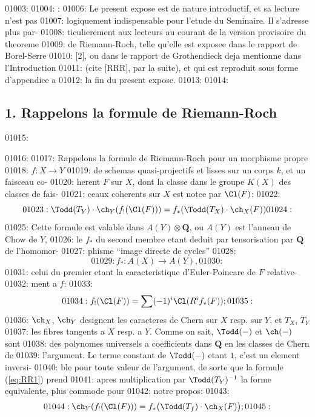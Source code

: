 01003: 
01004: : 
01006: Le present expose est de nature introductif, et sa lecture n'est pas
01007: logiquement indispensable pour l'etude du Seminaire. Il s'adresse plus par-
01008: ticulierement aux lecteurs au courant de la version provisoire du theoreme
01009: de Riemann-Roch, telle qu'elle est exposee dans le rapport de Borel-Serre
01010: [2], ou dans le rapport de Grothendieck deja mentionne dans l'Introduction
01011: (cite [RRR], par la suite), et qui est reproduit sous forme d'appendice a
01012: la fin du present expose.
01013: 
01014: \subsection*{1. Rappelons la formule de Riemann-Roch}
01015: 
01016: 
01017: Rappelons la formule de Riemann-Roch pour un morphisme propre
01018: $f: X \to Y$
01019: de schemas quasi-projectifs et lisses sur un corps $k$, et un faisceau co-
01020: herent $F$ sur $X$, dont la classe dans le groupe $K(X)$ des classes de fais-
01021: ceaux coherents sur $X$ est notee par $\Cl(F)$:
01022: \begin{equation}\label{eq:RR1}
01023: \Todd(T_Y) \cdot \ch_Y(f_{!}(\Cl(F))) = f_{*}(\Todd(T_X) \cdot \ch_X(F))
01024: \end{equation}
01025: Cette formule est valable dans $A(Y) \otimes \mathbf{Q}$, ou $A(Y)$ est l'anneau de Chow de $Y$,
01026: le $f_{*}$ du second membre etant deduit par tensorisation par $\mathbf{Q}$ de l'homomor-
01027: phisme ``image directe de cycles''
01028: \[
01029: f_{*}: A(X) \longrightarrow A(Y),
01030: \]
01031: celui du premier etant la caracteristique d'Euler-Poincare de $F$ relative-
01032: ment a $f$:
01033: \[
01034: f_{!}(\Cl(F)) = \sum (-1)^i \Cl(R^i f_{*}(F));
01035: \]
01036: $\ch_X$, $\ch_Y$ designent les caracteres de Chern sur $X$ resp. sur $Y$, et $T_X$, $T_Y$
01037: les fibres tangents a $X$ resp. a $Y$. Comme on sait, $\Todd(-)$ et $\ch(-)$ sont
01038: des polynomes universels a coefficients dans $\mathbf{Q}$ en les classes de Chern de
01039: l'argument. Le terme constant de $\Todd(-)$ etant $1$, c'est un element inversi-
01040: ble pour toute valeur de l'argument, de sorte que la formule (\ref{eq:RR1}) prend
01041: apres multiplication par $\Todd(T_Y)^{-1}$ la forme equivalente, plus commode pour
01042: notre propos:
01043: \begin{equation}\label{eq:RR2}
01044: \ch_Y(f_{!}(\Cl(F))) = f_{*}\bigl(\Todd(T_f) \cdot \ch_X(F)\bigr);
01045: \end{equation}
